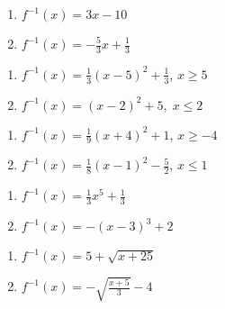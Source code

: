 \begin{multicols}{2}
\begin{enumerate}
\setcounter{enumi}{\value{HW}}

\item  $f^{-1}(x) = 3x-10$
\item $f^{-1}(x)  = -\frac{5}{3} x + \frac{1}{3}$


\setcounter{HW}{\value{enumi}}
\end{enumerate}
\end{multicols}

\begin{multicols}{2}
\begin{enumerate}
\setcounter{enumi}{\value{HW}}


\item $f^{-1}(x) = \frac{1}{3}(x-5)^2+\frac{1}{3}$, $x \geq 5$
\item $f^{-1}(x) = (x - 2)^{2} + 5, \; x \leq 2$

\setcounter{HW}{\value{enumi}}
\end{enumerate}
\end{multicols}

\begin{multicols}{2}
\begin{enumerate}
\setcounter{enumi}{\value{HW}}


\item $f^{-1}(x) = \frac{1}{9}(x+4)^2+1$, $x \geq -4$

\item $f^{-1}(x) = \frac{1}{8}(x-1)^2-\frac{5}{2}$, $x \leq 1$

\setcounter{HW}{\value{enumi}}
\end{enumerate}
\end{multicols}

\begin{multicols}{2}
\begin{enumerate}
\setcounter{enumi}{\value{HW}}

\item $f^{-1}(x) = \frac{1}{3} x^{5} + \frac{1}{3}$
\item $f^{-1}(x) = -(x-3)^3+2$

\setcounter{HW}{\value{enumi}}
\end{enumerate}
\end{multicols}

\begin{multicols}{2}
\begin{enumerate}
\setcounter{enumi}{\value{HW}}

\item $f^{-1}(x) = 5 + \sqrt{x+25}$
\item $f^{-1}(x) = -\sqrt{\frac{x + 5}{3}} - 4$

\setcounter{HW}{\value{enumi}}
\end{enumerate}
\end{multicols}

